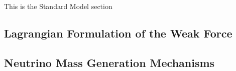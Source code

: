 This is the Standard Model section
\subsection{Lagrangian Formulation of the Weak Force}
\subsection{Neutrino Mass Generation Mechanisms}
